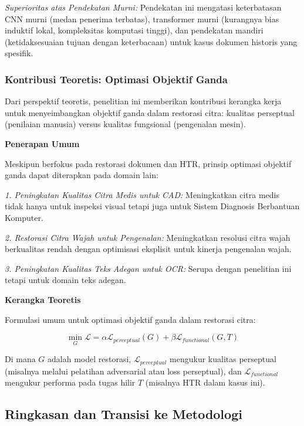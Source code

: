 \documentclass[12pt,a4paper]{article}
\begin{document}
\textit{Superioritas atas Pendekatan Murni:} Pendekatan ini mengatasi keterbatasan CNN murni (medan penerima terbatas), transformer murni (kurangnya bias induktif lokal, kompleksitas komputasi tinggi), dan pendekatan mandiri (ketidaksesuaian tujuan dengan keterbacaan) untuk kasus dokumen historis yang spesifik.

\subsubsection{Kontribusi Teoretis: Optimasi Objektif Ganda}
\label{subsubsec:theoretical-contribution}

Dari perspektif teoretis, penelitian ini memberikan kontribusi kerangka kerja untuk menyeimbangkan objektif ganda dalam restorasi citra: kualitas perseptual (penilaian manusia) versus kualitas fungsional (pengenalan mesin).

\textbf{Penerapan Umum}

Meskipun berfokus pada restorasi dokumen dan HTR, prinsip optimasi objektif ganda dapat diterapkan pada domain lain:

\textit{1. Peningkatan Kualitas Citra Medis untuk CAD:} Meningkatkan citra medis tidak hanya untuk inspeksi visual tetapi juga untuk Sistem Diagnosis Berbantuan Komputer.

\textit{2. Restorasi Citra Wajah untuk Pengenalan:} Meningkatkan resolusi citra wajah berkualitas rendah dengan optimisasi eksplisit untuk kinerja pengenalan wajah.

\textit{3. Peningkatan Kualitas Teks Adegan untuk OCR:} Serupa dengan penelitian ini tetapi untuk domain teks adegan.

\textbf{Kerangka Teoretis}

Formulasi umum untuk optimasi objektif ganda dalam restorasi citra:

\begin{equation}
\min_G \mathcal{L} = \alpha \mathcal{L}_{perceptual}(G) + \beta \mathcal{L}_{functional}(G, T)
\end{equation}

Di mana $G$ adalah model restorasi, $\mathcal{L}_{perceptual}$ mengukur kualitas perseptual (misalnya melalui pelatihan adversarial atau loss perseptual), dan $\mathcal{L}_{functional}$ mengukur performa pada tugas hilir $T$ (misalnya HTR dalam kasus ini).

\subsection{Ringkasan dan Transisi ke Metodologi}
\label{subsec:tinjauan-summary}
\end{document}
